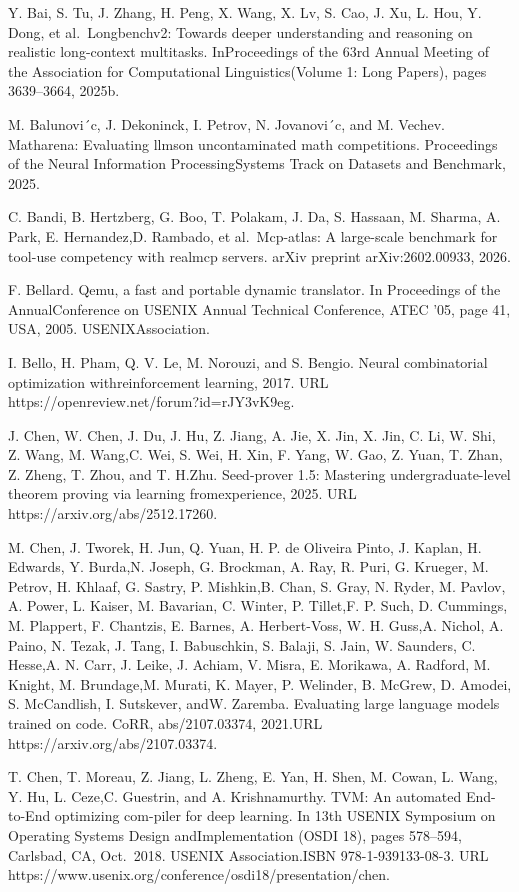 \documentclass[
  10
]{article}
\begin{document}
Y. Bai, S. Tu, J. Zhang, H. Peng, X. Wang, X. Lv, S. Cao, J. Xu, L. Hou,
Y. Dong, et al.~Longbenchv2: Towards deeper understanding and reasoning
on realistic long-context multitasks. InProceedings of the 63rd Annual
Meeting of the Association for Computational Linguistics(Volume 1: Long
Papers), pages 3639--3664, 2025b.

M. Balunovi´c, J. Dekoninck, I. Petrov, N. Jovanovi´c, and M. Vechev.
Matharena: Evaluating llmson uncontaminated math competitions.
Proceedings of the Neural Information ProcessingSystems Track on
Datasets and Benchmark, 2025.

C. Bandi, B. Hertzberg, G. Boo, T. Polakam, J. Da, S. Hassaan, M.
Sharma, A. Park, E. Hernandez,D. Rambado, et al.~Mcp-atlas: A
large-scale benchmark for tool-use competency with realmcp servers.
arXiv preprint arXiv:2602.00933, 2026.

F. Bellard. Qemu, a fast and portable dynamic translator. In Proceedings
of the AnnualConference on USENIX Annual Technical Conference, ATEC '05,
page 41, USA, 2005. USENIXAssociation.

I. Bello, H. Pham, Q. V. Le, M. Norouzi, and S. Bengio. Neural
combinatorial optimization withreinforcement learning, 2017. URL
https://openreview.net/forum?id=rJY3vK9eg.

J. Chen, W. Chen, J. Du, J. Hu, Z. Jiang, A. Jie, X. Jin, X. Jin, C. Li,
W. Shi, Z. Wang, M. Wang,C. Wei, S. Wei, H. Xin, F. Yang, W. Gao, Z.
Yuan, T. Zhan, Z. Zheng, T. Zhou, and T. H.Zhu. Seed-prover 1.5:
Mastering undergraduate-level theorem proving via learning
fromexperience, 2025. URL https://arxiv.org/abs/2512.17260.

M. Chen, J. Tworek, H. Jun, Q. Yuan, H. P. de Oliveira Pinto, J. Kaplan,
H. Edwards, Y. Burda,N. Joseph, G. Brockman, A. Ray, R. Puri, G.
Krueger, M. Petrov, H. Khlaaf, G. Sastry, P. Mishkin,B. Chan, S. Gray,
N. Ryder, M. Pavlov, A. Power, L. Kaiser, M. Bavarian, C. Winter, P.
Tillet,F. P. Such, D. Cummings, M. Plappert, F. Chantzis, E. Barnes, A.
Herbert-Voss, W. H. Guss,A. Nichol, A. Paino, N. Tezak, J. Tang, I.
Babuschkin, S. Balaji, S. Jain, W. Saunders, C. Hesse,A. N. Carr, J.
Leike, J. Achiam, V. Misra, E. Morikawa, A. Radford, M. Knight, M.
Brundage,M. Murati, K. Mayer, P. Welinder, B. McGrew, D. Amodei, S.
McCandlish, I. Sutskever, andW. Zaremba. Evaluating large language
models trained on code. CoRR, abs/2107.03374, 2021.URL
https://arxiv.org/abs/2107.03374.

T. Chen, T. Moreau, Z. Jiang, L. Zheng, E. Yan, H. Shen, M. Cowan, L.
Wang, Y. Hu, L. Ceze,C. Guestrin, and A. Krishnamurthy. TVM: An
automated End-to-End optimizing com-piler for deep learning. In 13th
USENIX Symposium on Operating Systems Design andImplementation (OSDI
18), pages 578--594, Carlsbad, CA, Oct.~2018. USENIX Association.ISBN
978-1-939133-08-3. URL
https://www.usenix.org/conference/osdi18/presentation/chen.
\end{document}
